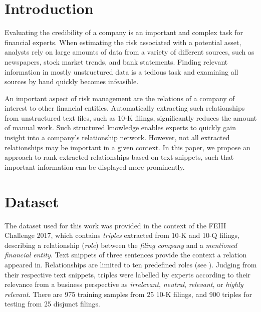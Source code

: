 \section{Introduction}

Evaluating the credibility of a company is an important and complex task for financial experts.
When estimating the risk associated with a potential asset, analysts rely on large amounts of data from a variety of different sources, such as newspapers, stock market trends, and bank statements.
Finding relevant information in mostly unstructured data is a tedious task and examining all sources by hand quickly becomes infeasible.

An important aspect of risk management are the relations of a company of interest to other financial entities.
Automatically extracting such relationships from unstructured text files, such as 10-K filings, significantly reduces the amount of manual work.
Such structured knowledge enables experts to quickly gain insight into a company's relationship network.
However, not all extracted relationships may be important in a given context.
In this paper, we propose an approach to rank extracted relationships based on text snippets, such that important information can be displayed more prominently.


\section{Dataset}
The dataset used for this work was provided in the context of the FEIII Challenge 2017\cite{feiii_overview}, which contains \emph{triples} extracted from 10-K and 10-Q filings, describing a relationship (\emph{role}) between the \emph{filing company} and a \emph{mentioned financial entity}.
Text snippets of three sentences provide the context a relation appeared in.
Relationships are limited to ten predefined roles (see ).
Judging from their respective text snippets, triples were labelled by experts according to their relevance from a business perspective as \emph{irrelevant}, \emph{neutral}, \emph{relevant}, or \emph{highly relevant}. There are 975 training samples from 25 10-K filings, and 900 triples for testing from 25 disjunct filings.

